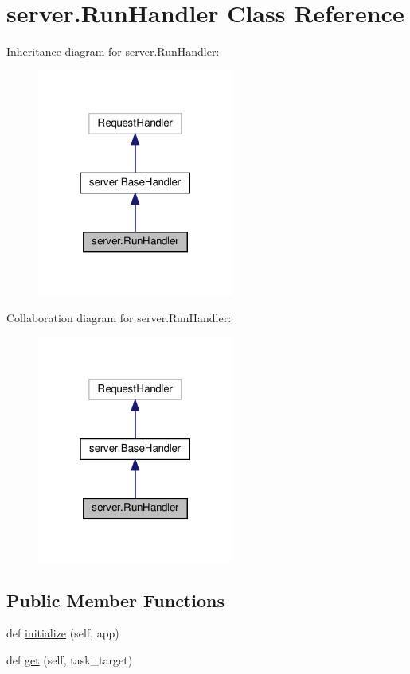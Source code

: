 \hypertarget{classserver_1_1RunHandler}{}\section{server.\+Run\+Handler Class Reference}
\label{classserver_1_1RunHandler}


Inheritance diagram for server.\+Run\+Handler\+:
\nopagebreak
\begin{figure}[H]
\begin{center}
\leavevmode
\includegraphics[width=183pt]{classserver_1_1RunHandler__inherit__graph}
\end{center}
\end{figure}


Collaboration diagram for server.\+Run\+Handler\+:
\nopagebreak
\begin{figure}[H]
\begin{center}
\leavevmode
\includegraphics[width=183pt]{classserver_1_1RunHandler__coll__graph}
\end{center}
\end{figure}
\subsection*{Public Member Functions}
\begin{DoxyCompactItemize}
\item 
def \hyperlink{classserver_1_1RunHandler_a788d5598d824abeca0a5e0ff0747eb68}{initialize} (self, app)
\item 
def \hyperlink{classserver_1_1RunHandler_a3dd94b1f7d68486782facb8bdbc74957}{get} (self, task\+\_\+target)
\end{DoxyCompactItemize}
